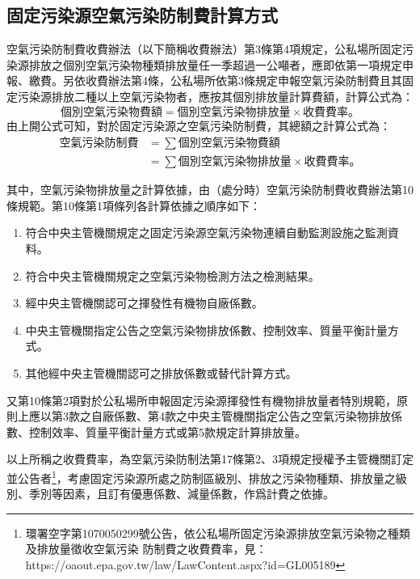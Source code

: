 \documentclass[14pt,a4paper]{article}
\begin{document}
\subsection{固定污染源空氣污染防制費計算方式}
空氣污染防制費收費辦法（以下簡稱收費辦法）第3條第4項規定，公私場所固定污染源排放之個別空氣污染物種類排放量任一季超過一公噸者，應即依第一項規定申報、繳費。另依收費辦法第4條，公私場所依第3條規定申報空氣污染防制費且其固定污染源排放二種以上空氣污染物者，應按其個別排放量計算費額，計算公式為：
\[\text{個別空氣污染物費額}=\text{個別空氣污染物排放量}\times \text{收費費率。}\]
由上開公式可知，對於固定污染源之空氣污染防制費，其總額之計算公式為：
\begin{equation*}
  \begin{aligned}
    \text{空氣污染防制費}&=\sum \text{個別空氣污染物費額}\\
    &=\sum\text{個別空氣污染物排放量}\times \text{收費費率。}
  \end{aligned}
\end{equation*}

其中，空氣污染物排放量之計算依據，由（處分時）空氣污染防制費收費辦法第10條規範。第10條第1項條列各計算依據之順序如下：
\begin{enumerate}[itemsep=0em]
  \item 符合中央主管機關規定之固定污染源空氣污染物連續自動監測設施之監測資料。
  \item 符合中央主管機關規定之空氣污染物檢測方法之檢測結果。
  \item 經中央主管機關認可之揮發性有機物自廠係數。
  \item 中央主管機關指定公告之空氣污染物排放係數、控制效率、質量平衡計量方式。
  \item 其他經中央主管機關認可之排放係數或替代計算方式。
\end{enumerate}
又第10條第2項對於公私場所申報固定污染源揮發性有機物排放量者特別規範，原則上應以第3款之自廠係數、第4款之中央主管機關指定公告之空氣污染物排放係數、控制效率、質量平衡計量方式或第5款規定計算排放量。

以上所稱之收費費率，為空氣污染防制法第17條第2、3項規定授權予主管機關訂定並公告者\footnote{環署空字第1070050299號公告，依公私場所固定污染源排放空氣污染物之種類及排放量徵收空氣污染
防制費之收費費率，見：https://oaout.epa.gov.tw/law/LawContent.aspx?id=GL005189}，考慮固定污染源所處之防制區級別、排放之污染物種類、排放量之級別、季別等因素，且訂有優惠係數、減量係數，作爲計費之依據。
\end{document}
